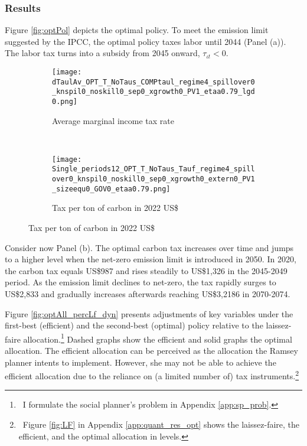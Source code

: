 \subsubsection{Results}\label{sec:optres}
Figure \ref{fig:optPol} depicts the optimal policy.
To meet the emission limit suggested by the IPCC, the optimal policy taxes labor until 2044 (Panel (a)). The labor tax  turns into a subsidy from 2045 onward, $\tau_{\iota t}<0$. 
\begin{figure}[h!!]
	\centering
	\caption{Optimal policy }\label{fig:optPol}
	\begin{subfigure}{0.4\textwidth}
		\caption{Average marginal income tax rate }
		\texttt{[image: dTaulAv\_OPT\_T\_NoTaus\_COMPtaul\_regime4\_spillover0\_knspil0\_noskill0\_sep0\_xgrowth0\_PV1\_etaa0.79\_lgd0.png]}
	\end{subfigure}
\begin{minipage}[]{0.1\textwidth}
	\
\end{minipage}
	\begin{subfigure}{0.4\textwidth}
		\caption{Tax per ton of carbon in 2022 US\$ }
		\texttt{[image: Single\_periods12\_OPT\_T\_NoTaus\_Tauf\_regime4\_spillover0\_knspil0\_noskill0\_sep0\_xgrowth0\_extern0\_PV1\_sizeequ0\_GOV0\_etaa0.79.png]}
	\end{subfigure}
\end{figure} 
Consider now Panel (b). The optimal carbon tax increases over time and jumps to a higher level when the net-zero emission limit is introduced in 2050.
In 2020, the carbon tax equals US\$987 and rises steadily to US\$1,326 in the 2045-2049 period.  As the emission limit declines to net-zero, the tax rapidly surges to US\$2,833 and gradually increases afterwards reaching US\$3,2186 in 2070-2074. 

Figure \ref{fig:optAll_percLf_dyn} presents adjustments of key variables under the first-best (efficient) and the second-best (optimal) policy relative to the laissez-faire allocation.\footnote{\ I formulate the social planner's problem in Appendix \ref{app:sp_prob}. }  Dashed graphs show the efficient and solid graphs the optimal allocation.
The efficient allocation can be perceived as the allocation the Ramsey planner intents to implement. However, she may not be able to achieve the efficient allocation due to the reliance on (a limited number of) tax instruments.\footnote{\ Figure \ref{fig:LF} in Appendix \ref{app:quant_res_opt}  shows the laissez-faire, the efficient, and the optimal allocation in levels.}

